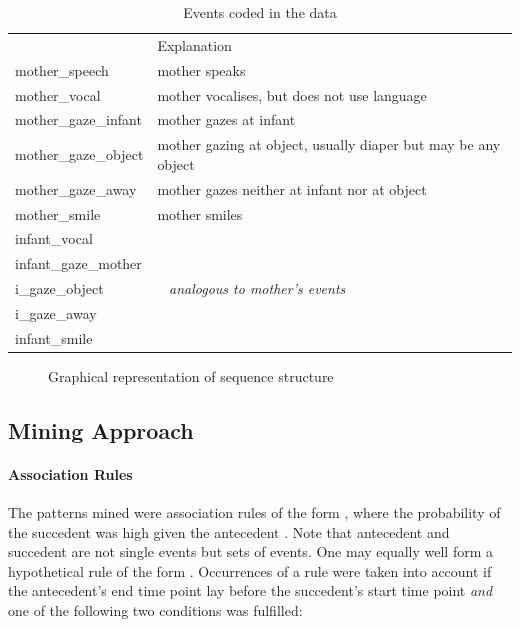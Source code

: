 \begin{table}[h]
	\centering
	\begin{tabularx}{\textwidth}{>{\ttfamily}lX} 
		\toprule
		{\rmfamily Event}		& Explanation \\
		\cmidrule(lr){1-1} \cmidrule(lr){2-2}
		mother\_speech			& mother speaks \\
		mother\_vocal			& mother vocalises, but does not use language \\
		mother\_gaze\_infant	& mother gazes at infant \\
		mother\_gaze\_object	& mother gazing at object, usually diaper but may be any object \\
		mother\_gaze\_away		& mother gazes neither at infant nor at object \\
		mother\_smile			& mother smiles \\
		\cmidrule(lr){1-1} \cmidrule(lr){2-2}
		infant\_vocal \\
		infant\_gaze\_mother \\
		i\_gaze\_object			& ~ \hfill \textit{analogous to mother's events} \hfill ~ \\
		i\_gaze\_away \\
		infant\_smile \\
		\bottomrule
	\end{tabularx}
	\caption{Events coded in the data}
	\label{tab:events}
\end{table}

\begin{figure}
	\centering
	
	\caption{Graphical representation of sequence structure}
	\label{fig:idealseq}
\end{figure}

\subsection{Mining Approach}
\label{ssec:miningmethodapproach}

\paragraph{Association Rules}
The patterns \citet{rohlfing18} mined were association rules of the form , where the probability of the succedent  was high given the antecedent . Note that antecedent and succedent are not single events but sets of events. One may equally well form a hypothetical rule of the form . Occurrences of a rule were taken into account if the antecedent's end time point lay before the succedent's start time point \emph{and} one of the following two conditions was fulfilled:

